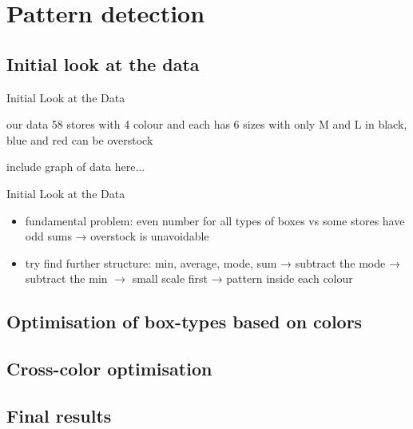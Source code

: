 \documentclass{beamer}
\begin{document}
\section{Pattern detection}


\subsection{Initial look at the data}

\begin{frame}{Initial Look at the Data}
\begin{block}{our data}
	58 stores with 4 colour and each has 6 sizes with only M and L in black, blue and red can be overstock 
\end{block}
include graph of data here...
\end{frame}

\begin{frame}{Initial Look at the Data}
 \begin{itemize}
	\item fundamental problem: 
	even number for all types of boxes vs some stores have odd sums → overstock is unavoidable
	\item try find further structure:
	min, average, mode, sum → subtract the mode → subtract the min $\rightarrow$ small scale first → pattern inside each colour
\end{itemize}
\end{frame}

\subsection{Optimisation of box-types based on colors}



\subsection{Cross-color optimisation}


\subsection{Final results}

\end{document}
